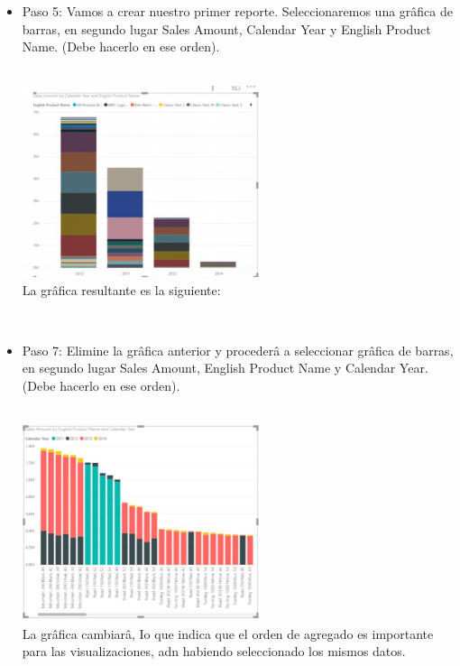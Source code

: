 \documentclass[preprint,12pt]{elsarticle}
\begin{document}
\begin{itemize}
			
			
			
			\\ \item  Paso 5: Vamos a crear nuestro primer reporte. Seleccionaremos una grâfica de barras, en segundo lugar Sales Amount, Calendar Year y English Product Name. (Debe hacerlo en ese orden).
			
				\\ \includegraphics[width=7cm]{./IMAGENES/6} \\
			
			
			
			La grâfica resultante es la siguiente:
			
			
			
			
			
			
			\\ \item Paso 7: Elimine la grâfica anterior y procederâ a seleccionar grâfica de barras, en segundo lugar Sales Amount, English Product Name y Calendar Year. (Debe hacerlo en ese orden).
			
				\\ \includegraphics[width=7cm]{./IMAGENES/7} \\
			
			
			
			La grâfica cambiarâ, Io que indica que el orden de agregado es importante para las visualizaciones, adn habiendo seleccionado los mismos datos.
			

\end{itemize}
\end{document}
